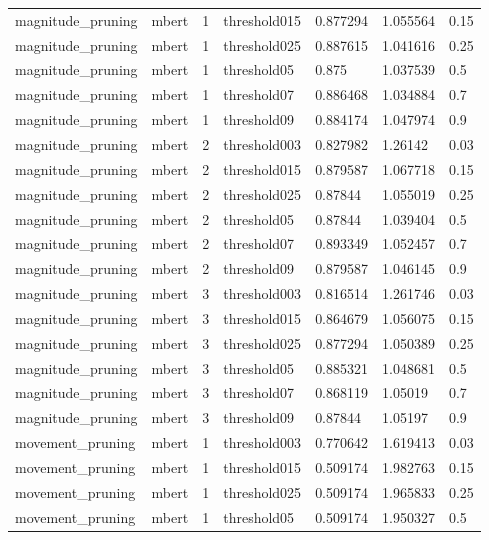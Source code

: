 \begin{tabular}{lllllll}
    magnitude\_pruning & mbert &   1 & threshold015 &  0.877294 &  1.055564 &   0.15 \\
    magnitude\_pruning & mbert &   1 & threshold025 &  0.887615 &  1.041616 &   0.25 \\
    magnitude\_pruning & mbert &   1 &  threshold05 &     0.875 &  1.037539 &    0.5 \\
    magnitude\_pruning & mbert &   1 &  threshold07 &  0.886468 &  1.034884 &    0.7 \\
    magnitude\_pruning & mbert &   1 &  threshold09 &  0.884174 &  1.047974 &    0.9 \\
    magnitude\_pruning & mbert &   2 & threshold003 &  0.827982 &   1.26142 &   0.03 \\
    magnitude\_pruning & mbert &   2 & threshold015 &  0.879587 &  1.067718 &   0.15 \\
    magnitude\_pruning & mbert &   2 & threshold025 &   0.87844 &  1.055019 &   0.25 \\
    magnitude\_pruning & mbert &   2 &  threshold05 &   0.87844 &  1.039404 &    0.5 \\
    magnitude\_pruning & mbert &   2 &  threshold07 &  0.893349 &  1.052457 &    0.7 \\
    magnitude\_pruning & mbert &   2 &  threshold09 &  0.879587 &  1.046145 &    0.9 \\
    magnitude\_pruning & mbert &   3 & threshold003 &  0.816514 &  1.261746 &   0.03 \\
    magnitude\_pruning & mbert &   3 & threshold015 &  0.864679 &  1.056075 &   0.15 \\
    magnitude\_pruning & mbert &   3 & threshold025 &  0.877294 &  1.050389 &   0.25 \\
    magnitude\_pruning & mbert &   3 &  threshold05 &  0.885321 &  1.048681 &    0.5 \\
    magnitude\_pruning & mbert &   3 &  threshold07 &  0.868119 &   1.05019 &    0.7 \\
    magnitude\_pruning & mbert &   3 &  threshold09 &   0.87844 &   1.05197 &    0.9 \\
     movement\_pruning & mbert &   1 & threshold003 &  0.770642 &  1.619413 &   0.03 \\
     movement\_pruning & mbert &   1 & threshold015 &  0.509174 &  1.982763 &   0.15 \\
     movement\_pruning & mbert &   1 & threshold025 &  0.509174 &  1.965833 &   0.25 \\
     movement\_pruning & mbert &   1 &  threshold05 &  0.509174 &  1.950327 &    0.5 \\

\end{tabular}
